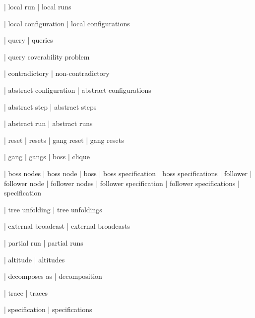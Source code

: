 | local run
| local runs

| local configuration
| local configurations

| query
| queries

| query coverability problem

| contradictory
| non-contradictory

| abstract configuration
| abstract configurations

| abstract step
| abstract steps


| abstract run
| abstract runs

| reset
| resets
| gang reset
| gang resets



| gang
| gangs
| boss
| clique


| boss nodes
| boss node
| boss
| boss specification
| boss specifications
| follower
| follower node
| follower nodes
| follower specification
| follower specifications
| specification

| tree unfolding
| tree unfoldings

| external broadcast
| external broadcasts

| partial run
| partial runs

| altitude
| altitudes

| decomposes as
| decomposition

| trace
| traces

| specification
| specifications

